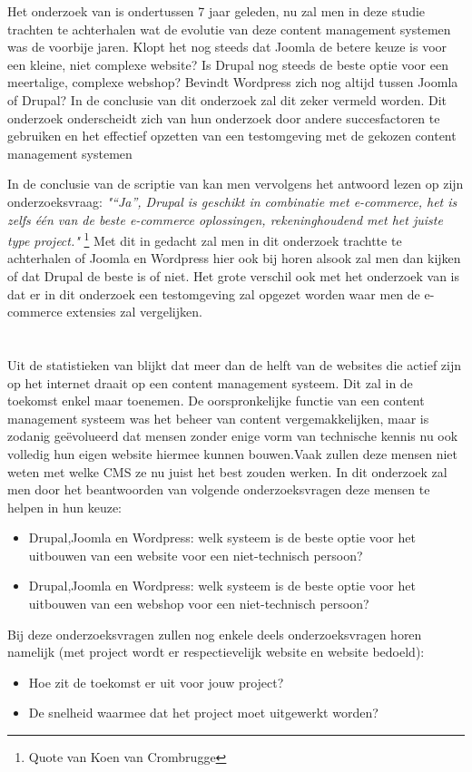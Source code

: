 Het onderzoek van \textcite{Patel2011} is ondertussen 7 jaar geleden, nu zal men in deze studie trachten te achterhalen wat de evolutie van deze content management systemen was de voorbije jaren. Klopt het nog steeds dat Joomla de betere keuze is voor een kleine, niet complexe website? Is Drupal nog steeds de beste optie voor een meertalige, complexe webshop? Bevindt Wordpress zich nog altijd tussen Joomla of Drupal? In de conclusie van dit onderzoek zal dit zeker vermeld worden. Dit onderzoek onderscheidt zich van \textcite{Patel2011} hun onderzoek door andere succesfactoren te gebruiken en het effectief opzetten van een testomgeving met de gekozen content management systemen

In de conclusie van de scriptie van \textcite{Crombrugge2015} kan men vervolgens het antwoord lezen op zijn onderzoeksvraag: \textit{"“Ja”, Drupal is geschikt in combinatie met e-commerce, het is zelfs één van de beste e-commerce oplossingen, rekeninghoudend met het juiste type project."} \footnote{Quote van Koen van Crombrugge}\parencite{Crombrugge2015} Met dit in gedacht zal men in dit onderzoek trachtte te achterhalen of Joomla en Wordpress hier ook bij horen alsook zal men dan kijken of dat Drupal de beste is of niet. Het grote verschil ook met het onderzoek van \textcite{Crombrugge2015} is dat er in dit onderzoek een testomgeving zal  opgezet worden waar men de e-commerce extensies zal vergelijken.

\section{}
\label{sec:onderzoeksvraag}

Uit de statistieken van \textcite{Builtwith2018} blijkt dat meer dan de helft van de websites die actief zijn op het internet draait op een content management systeem. Dit zal in de toekomst enkel maar toenemen. De oorspronkelijke functie van een content management systeem was het beheer van content vergemakkelijken, maar is zodanig geëvolueerd dat mensen zonder enige vorm van technische kennis nu ook volledig hun eigen website hiermee kunnen bouwen.Vaak zullen deze mensen niet weten met welke CMS ze nu juist het best zouden werken. In dit onderzoek zal men door het beantwoorden van volgende onderzoeksvragen deze mensen te helpen in hun keuze:
\begin{itemize}
	\item Drupal,Joomla en Wordpress: welk systeem is de beste optie voor het uitbouwen van een website voor een niet-technisch persoon?
	\item Drupal,Joomla en Wordpress: welk systeem is de beste optie voor het uitbouwen van een webshop voor een niet-technisch persoon?
\end{itemize}
Bij deze onderzoeksvragen zullen nog enkele deels onderzoeksvragen horen namelijk (met project wordt er respectievelijk website en website bedoeld):
\begin{itemize}
    \item Hoe zit de toekomst er uit voor jouw project?
    \item De snelheid waarmee dat het project moet uitgewerkt worden?
\end{itemize}

